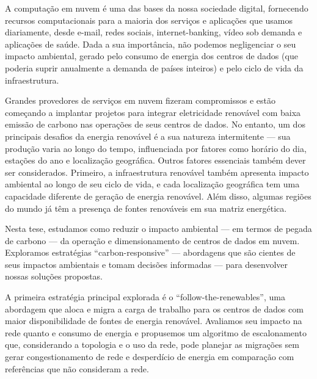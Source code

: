 
A computação em nuvem é uma das bases da nossa sociedade digital, fornecendo recursos computacionais para a maioria dos serviços e aplicações que usamos diariamente, desde e-mail, redes sociais, internet-banking, vídeo sob demanda e aplicações de saúde. Dada a sua importância, não podemos negligenciar o seu impacto ambiental, gerado pelo consumo de energia dos centros de dados (que poderia suprir anualmente a demanda de países inteiros) e pelo ciclo de vida da infraestrutura.


Grandes provedores de serviços em nuvem fizeram compromissos e estão começando a implantar projetos para integrar eletricidade renovável com baixa emissão de carbono nas operações de seus centros de dados. No entanto, um dos principais desafios da energia renovável é a sua natureza intermitente --- sua produção varia ao longo do tempo, influenciada por fatores como horário do dia, estações do ano e localização geográfica. Outros fatores essenciais também dever ser considerados. Primeiro, a infraestrutura renovável também apresenta impacto ambiental ao longo de seu ciclo de vida, e cada localização geográfica tem uma capacidade diferente de geração de energia renovável. Além disso, algumas regiões do mundo já têm a presença de fontes renováveis em sua matriz energética.


Nesta tese, estudamos como reduzir o impacto ambiental --- em termos de pegada de carbono --- da operação e dimensionamento de centros de dados em nuvem. Exploramos estratégias ``carbon-responsive'' --- abordagens que são cientes de seus impactos ambientais e tomam decisões informadas --- para desenvolver nossas soluções propostas.

A primeira estratégia principal explorada é o ``follow-the-renewables'', uma abordagem que aloca e migra a carga de trabalho para os centros de dados com maior disponibilidade de fontes de energia renovável. Avaliamos seu impacto na rede quanto e consumo de energia e propusemos um algoritmo de escalonamento que, considerando a topologia  e o uso da rede, pode planejar as migrações sem gerar congestionamento de rede e desperdício de energia em comparação com referências que não consideram a rede.

